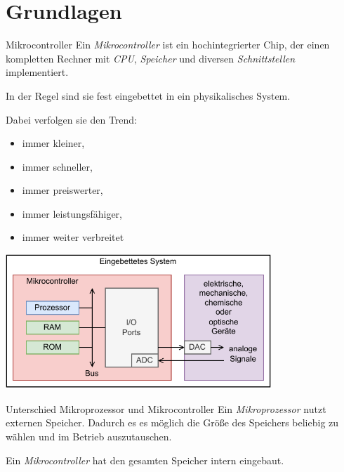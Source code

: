 \section{Grundlagen}

\begin{defi}{Mikrocontroller}
    Ein \emph{Mikrocontroller} ist ein hochintegrierter Chip, der einen kompletten Rechner mit \emph{CPU}, \emph{Speicher} und diversen \emph{Schnittstellen} implementiert.

    In der Regel sind sie fest eingebettet in ein physikalisches System.

    Dabei verfolgen sie den Trend:
    \begin{itemize}
        \item immer kleiner,
        \item immer schneller,
        \item immer preiswerter,
        \item immer leistungsfähiger,
        \item immer weiter verbreitet
    \end{itemize}

    \vspace{1em}

    \begin{center}
        \includegraphics[width=0.75\textwidth]{includes/figures/defi_microcontroller.pdf}
    \end{center}
\end{defi}

\begin{bonus}{Unterschied Mikroprozessor und Mikrocontroller}
    Ein \emph{Mikroprozessor} nutzt externen Speicher.
    Dadurch es es möglich die Größe des Speichers beliebig zu wählen und im Betrieb auszutauschen.

    Ein \emph{Mikrocontroller} hat den gesamten Speicher intern eingebaut.
\end{bonus}

